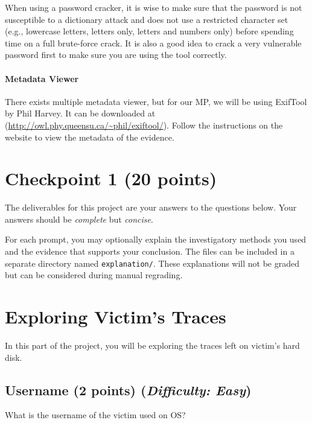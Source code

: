 \documentclass[letterpaper,12pt]{report}
\begin{document}
\medskip

When using a password cracker, it is wise to make sure that the password is not susceptible to a dictionary attack and does not use a restricted character set (e.g., lowercase letters, letters only, letters and numbers only) before spending time on a full brute-force crack. It is also a good idea to crack a very vulnerable password first to make sure you are using the tool correctly.

\paragraph{Metadata Viewer}
There exists multiple metadata viewer, but for our MP, we will be using ExifTool by Phil Harvey. It can be downloaded at (\url{http://owl.phy.queensu.ca/~phil/exiftool/}). Follow the instructions on the website to view the metadata of the evidence. 

\newpage

\setcounter{chapter}{5}

\section{Checkpoint 1 (20 points)}
\label{sec:checkpoint_1}

The deliverables for this project are your answers to the questions below. Your answers should be \emph{complete} but \emph{concise}.

\medskip 

For each prompt, you may optionally explain the investigatory methods you used and the evidence that supports your conclusion.  The files can be included in a separate directory named \texttt{explanation/}.  These explanations will not be graded but can be considered during manual regrading.

\section*{Exploring Victim's Traces}
\label{sec:victim_traces}
In this part of the project, you will be exploring the traces left on victim's hard disk.

\subsection{Username (2 points)    \hfill\rm\normalsize (\emph{Difficulty: Easy})}
\label{sec:username}
What is the username of the victim used on OS?
\end{document}
